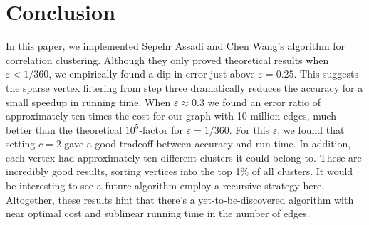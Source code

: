 \documentclass[
]{article}
\begin{document}
\hypertarget{conclusion}{%
  \section{Conclusion}\label{conclusion}}

In this paper, we implemented Sepehr Assadi and Chen Wang's algorithm for correlation clustering. Although they only proved theoretical results when $\varepsilon < 1/360$, we empirically found a dip in error just above $\varepsilon = 0.25$. This suggests the sparse vertex filtering from step three dramatically reduces the accuracy for a small speedup in running time. When $\varepsilon\approx 0.3$ we found an error ratio of approximately ten times the cost for our graph with 10 million edges, much better than the theoretical $10^5$-factor for $\varepsilon = 1/360$. For this $\varepsilon$, we found that setting $c = 2$ gave a good tradeoff between accuracy and run time. In addition, each vertex had approximately ten different clusters it could belong to. These are incredibly good results, sorting vertices into the top 1\% of all clusters. It would be interesting to see a future algorithm employ a recursive strategy here. Altogether, these results hint that there's a yet-to-be-discovered algorithm with near optimal cost and sublinear running time in the number of edges.
\nocite{*}


\end{document}
